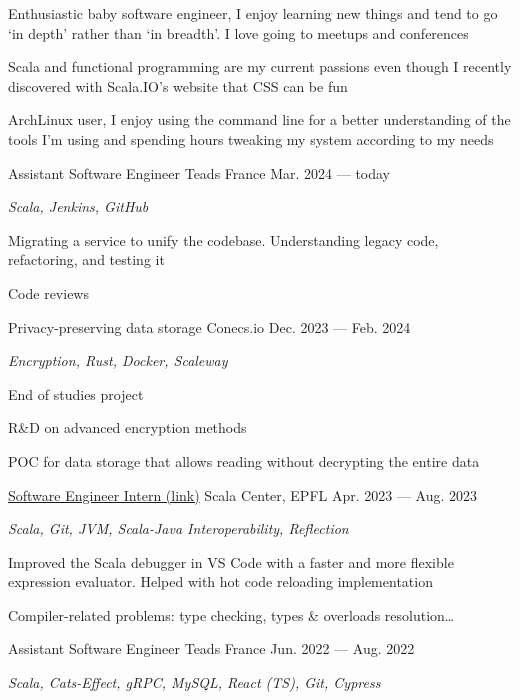 \begin{MainPart}
  \color{Black}
  \vspace{0.25cm}
  {
    \vspace{-\baselineskip}
    \begin{flushleft}
      Enthusiastic baby software engineer, I enjoy learning new things and tend to go `in depth' rather than `in breadth'. I love going to meetups and conferences

      \vspace{0.5\baselineskip}
      Scala and functional programming are my current passions even though I recently discovered with Scala.IO's website that CSS can be fun

      \vspace{0.5\baselineskip}
      ArchLinux user, I enjoy using the command line for a better understanding of the tools I'm using and spending hours tweaking my system according to my needs
    \end{flushleft}
  }

  \Experience%
  {Assistant Software Engineer}
  {Teads France}
  {Mar. 2024 --- today}
  {
    \textit{Scala, Jenkins, GitHub}

    \begin{ItemList}{\ColorHighlight}
      \item[\ding{226}] Migrating a service to unify the codebase. Understanding legacy code, refactoring, and testing it
      \item[\ding{226}] Code reviews
    \end{ItemList}
  }
  \Experience%
  {Privacy-preserving data storage}
  {Conecs.io}
  {Dec. 2023 --- Feb. 2024}
  {
    \textit{Encryption, Rust, Docker, Scaleway}

    End of studies project
    \begin{ItemList}{\ColorHighlight}
      \item[\ding{226}] R\&D on advanced encryption methods
      \item[\ding{226}] POC for data storage that allows reading without decrypting the entire data
    \end{ItemList}
  }
  \Experience%
  {\href{https://github.com/scalacenter/scala-debug-adapter/pulls?q=is\%3Apr+author\%3Aiusildra+}{Software Engineer Intern (link)}}
  {Scala Center, EPFL}
  {Apr. 2023 --- Aug. 2023}
  {
    \textit{Scala, Git, JVM, Scala-Java Interoperability, Reflection}
    \begin{ItemList}{\ColorHighlight}
      \item[\ding{226}] Improved the Scala debugger in VS Code with a faster and more flexible expression evaluator. Helped with hot code reloading implementation
      \item[\ding{226}] Compiler-related problems: type checking, types \& overloads resolution\dots
    \end{ItemList}
  }
  \Experience%
  {Assistant Software Engineer}
  {Teads France}
  {Jun. 2022 --- Aug. 2022}
  {
    \textit{Scala, Cats-Effect, gRPC, MySQL, React (TS), Git, Cypress}

}
\end{MainPart}
